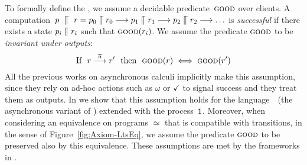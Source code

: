 To formally define the \mustpreorder, we assume a decidable
predicate~$\textsc{good}$ over clients.  A
computation~$ p~ \mathrel{\llceil} ~r = p_0  \mathrel{\llceil} 
  r_0 \mathrel{\overset{ }\longrightarrow} p_1  \mathrel{\llceil}  r_1 \mathrel{\overset{ }\longrightarrow} 
  p_2  \mathrel{\llceil}  r_2 \mathrel{\overset{ }\longrightarrow} \ldots $ is {\em successful} if
there exists a state $p_i \mathrel{\llceil}  r_i$ such that
$\textsc{good}(r_i)$.
%
We assume the predicate $\textsc{good}$
to be \emph{invariant under outputs}:
%
\begin{equation}
\label{eq:good-invariance}
  \text{If} ~~r \mathrel{\overset{ \overline{a}}\longrightarrow} r' ~~ \text{then}~~
  \textsc{good}( r) \iff \textsc{good}( r')
\end{equation}
%
All the previous works on
asynchronous calculi implicitly make this
assumption, since they rely on ad-hoc actions such as $\omega$ or
$\checkmark$ to signal success and they treat them as outputs.
In  we show that this
assumption holds for the language~\ACCS~(the asynchronous variant of
\CCS) extended with the
process~$\mathop{\textsf{1}}$.
%
Moreover, when considering an equivalence on programs $\simeq$ that is
compatible with transitions, in the sense of Figure~\ref{fig:Axiom-LtsEq}, we
assume the predicate $\textsc{good}$ to be preserved also by this equivalence.
%
These assumptions are met by the frameworks in
  \cite{DBLP:conf/fsttcs/CastellaniH98,DBLP:journals/iandc/BorealeNP02,DBLP:journals/jlp/Hennessy05}.






